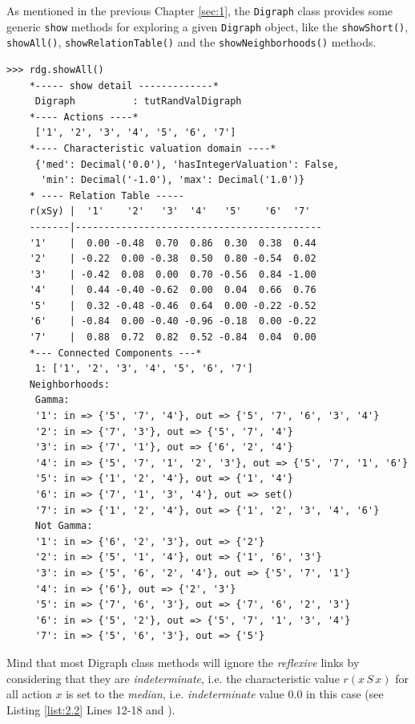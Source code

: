 As mentioned in the previous Chapter \ref{sec:1}, the {\tt Digraph} class provides some generic {\tt show} methods for exploring a given {\tt Digraph} object, like the {\tt showShort()}, {\tt showAll()}, {\tt showRelationTable()} and the {\tt showNeighborhoods()} methods.
\begin{lstlisting}[caption={Example of random valuation digraph},label=list:2.2]
   >>> rdg.showAll()
    *----- show detail -------------*
     Digraph          : tutRandValDigraph
    *---- Actions ----*
     ['1', '2', '3', '4', '5', '6', '7']
    *---- Characteristic valuation domain ----*
     {'med': Decimal('0.0'), 'hasIntegerValuation': False, 
      'min': Decimal('-1.0'), 'max': Decimal('1.0')}
    * ---- Relation Table -----
    r(xSy) |  '1'    '2'   '3'  '4'   '5'    '6'  '7'	  
    -------|-------------------------------------------
    '1'    |  0.00 -0.48  0.70  0.86  0.30  0.38  0.44	 
    '2'    | -0.22  0.00 -0.38  0.50  0.80 -0.54  0.02	 
    '3'    | -0.42  0.08  0.00  0.70 -0.56  0.84 -1.00	 
    '4'    |  0.44 -0.40 -0.62  0.00  0.04  0.66  0.76	 
    '5'    |  0.32 -0.48 -0.46  0.64  0.00 -0.22 -0.52	 
    '6'    | -0.84  0.00 -0.40 -0.96 -0.18  0.00 -0.22	 
    '7'    |  0.88  0.72  0.82  0.52 -0.84  0.04  0.00
    *--- Connected Components ---*
     1: ['1', '2', '3', '4', '5', '6', '7']
    Neighborhoods:
     Gamma:
     '1': in => {'5', '7', '4'}, out => {'5', '7', '6', '3', '4'}
     '2': in => {'7', '3'}, out => {'5', '7', '4'}
     '3': in => {'7', '1'}, out => {'6', '2', '4'}
     '4': in => {'5', '7', '1', '2', '3'}, out => {'5', '7', '1', '6'}
     '5': in => {'1', '2', '4'}, out => {'1', '4'}
     '6': in => {'7', '1', '3', '4'}, out => set()
     '7': in => {'1', '2', '4'}, out => {'1', '2', '3', '4', '6'}
     Not Gamma:
     '1': in => {'6', '2', '3'}, out => {'2'}
     '2': in => {'5', '1', '4'}, out => {'1', '6', '3'}
     '3': in => {'5', '6', '2', '4'}, out => {'5', '7', '1'}
     '4': in => {'6'}, out => {'2', '3'}
     '5': in => {'7', '6', '3'}, out => {'7', '6', '2', '3'}
     '6': in => {'5', '2'}, out => {'5', '7', '1', '3', '4'}
     '7': in => {'5', '6', '3'}, out => {'5'}
\end{lstlisting}   

Mind that most Digraph class methods will ignore the \emph{reflexive} links by considering that they are \emph{indeterminate}, i.e. the characteristic value $r(x\,S\,x)$ for all action $x$ is set to the \emph{median}, i.e. \emph{indeterminate} value $0.0$ in this case (see Listing \ref{list:2.2} Lines 12-18 and \citet{BIS-2004a}).

